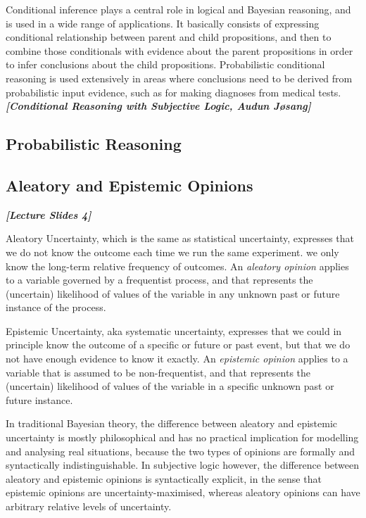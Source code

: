 \documentclass[UTF8]{article}
\newcommand{\mycite}[1]{\textbf{\textit{#1}}}
\begin{document}
Conditional inference plays a central role in logical and Bayesian
reasoning, and is used in a wide range of applications. It basically consists of expressing conditional relationship between
parent and child propositions, and then to combine those conditionals with evidence about the parent propositions in order to
infer conclusions about the child propositions. Probabilistic conditional reasoning is used extensively in areas where conclusions need to be derived from probabilistic input evidence, such as for making
diagnoses from medical tests. \mycite{[Conditional Reasoning with Subjective Logic, Audun Jøsang]}
\subsection{Probabilistic Reasoning}
\subsection{Aleatory and Epistemic Opinions}

\mycite{[Lecture Slides 4]}

Aleatory Uncertainty, which is the same as statistical uncertainty, expresses that we do not know the outcome each time we run the same experiment. we only know the long-term relative frequency of outcomes. An \textit{aleatory opinion} applies to a variable governed by a frequentist process, and that represents the (uncertain) likelihood of values of the variable in any unknown past or future instance of the process. 

Epistemic Uncertainty, aka systematic uncertainty, expresses that we could in principle know the outcome of a specific or future or past event, but that we do not have enough evidence to know it exactly. An \textit{epistemic opinion} applies to a variable that is assumed to be non-frequentist, and that represents the (uncertain) likelihood of values of the variable in a specific unknown past or future instance. 

In traditional Bayesian theory, the difference between aleatory and epistemic uncertainty is mostly philosophical and has no practical implication for modelling and analysing real situations, because the two types of opinions are formally and syntactically indistinguishable. In subjective logic however, the difference between aleatory and epistemic opinions is syntactically explicit, in the sense that epistemic opinions are uncertainty-maximised, whereas aleatory opinions can have arbitrary relative levels of uncertainty.
\end{document}
